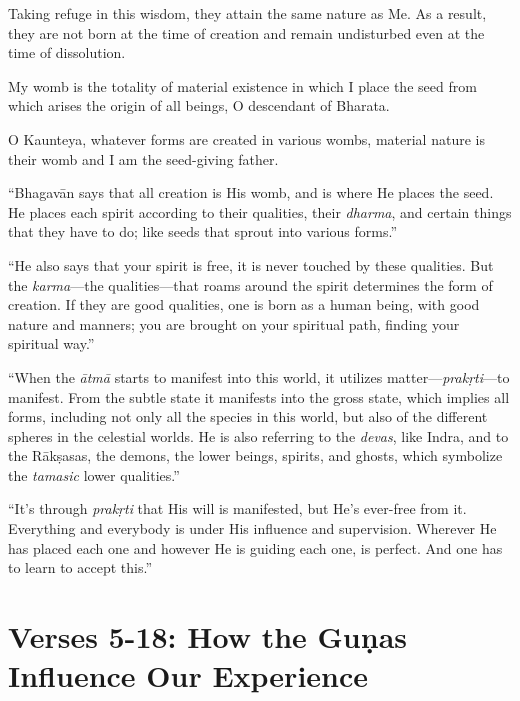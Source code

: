{Taking refuge in this wisdom, they attain the same nature as Me. As a result, they are not born at the time of creation and remain undisturbed even at the time of dissolution.}

{My womb is the totality of material existence in which I place the seed from which arises the origin of all beings, O descendant of Bharata.}

{O Kaunteya, whatever forms are created in various wombs, material nature is their womb and I am the seed-giving father.}

\enquote{Bhagavān says that all creation is His womb, and is where He places the seed. He places each spirit according to their qualities, their \textit{dharma}, and certain things that they have to do; like seeds that sprout into various forms.}

\enquote{He also says that your spirit is free, it is never touched by these qualities. But the \textit{karma}---the qualities---that roams around the spirit determines the form of creation. If they are good qualities, one is born as a human being, with good nature and manners; you are brought on your spiritual path, finding your spiritual way.}

\enquote{When the \textit{ātmā} starts to manifest into this world, it utilizes matter---\textit{prakṛti}---to manifest. From the subtle state it manifests into the gross state, which implies all forms, including not only all the species in this world, but also of the different spheres in the celestial worlds. He is also referring to the \textit{devas}, like Indra, and to the Rākṣasas, the demons, the lower beings, spirits, and ghosts, which symbolize the \textit{tamasic} lower qualities.}

\enquote{It’s through \textit{prakṛti} that His will is manifested, but He’s ever-free from it. Everything and everybody is under His influence and supervision. Wherever He has placed each one and however He is guiding each one, is perfect. And one has to learn to accept this.}

\section{Verses 5-18: How the Guṇas Influence Our Experience}\label{sec-verses-5-18-how-the-gunas-influence-our-experience}

